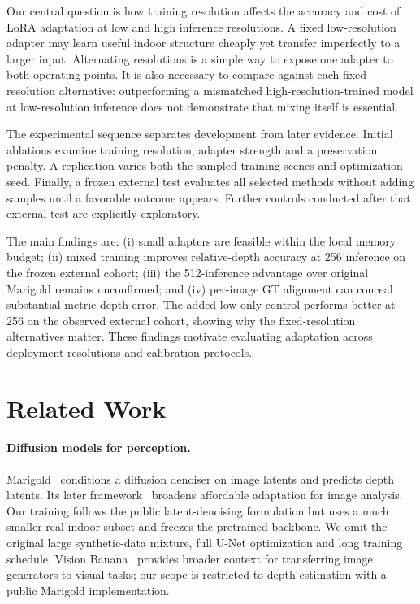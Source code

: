 Our central question is how training resolution affects the accuracy and cost of LoRA adaptation at low and high inference resolutions. A fixed low-resolution adapter may learn useful indoor structure cheaply yet transfer imperfectly to a larger input. Alternating resolutions is a simple way to expose one adapter to both operating points. It is also necessary to compare against each fixed-resolution alternative: outperforming a mismatched high-resolution-trained model at low-resolution inference does not demonstrate that mixing itself is essential.

The experimental sequence separates development from later evidence. Initial ablations examine training resolution, adapter strength and a preservation penalty. A replication varies both the sampled training scenes and optimization seed. Finally, a frozen external test evaluates all selected methods without adding samples until a favorable outcome appears. Further controls conducted after that external test are explicitly exploratory.

The main findings are: (i) small adapters are feasible within the local memory budget; (ii) mixed training improves relative-depth accuracy at 256 inference on the frozen external cohort; (iii) the 512-inference advantage over original Marigold remains unconfirmed; and (iv) per-image GT alignment can conceal substantial metric-depth error. The added low-only control performs better at 256 on the observed external cohort, showing why the fixed-resolution alternatives matter. These findings motivate evaluating adaptation across deployment resolutions and calibration protocols.

\section{Related Work}
\paragraph{Diffusion models for perception.}
Marigold~\cite{marigold} conditions a diffusion denoiser on image latents and predicts depth latents. Its later framework~\cite{marigold25} broadens affordable adaptation for image analysis. Our training follows the public latent-denoising formulation but uses a much smaller real indoor subset and freezes the pretrained backbone. We omit the original large synthetic-data mixture, full U-Net optimization and long training schedule. Vision Banana~\cite{banana} provides broader context for transferring image generators to visual tasks; our scope is restricted to depth estimation with a public Marigold implementation.

